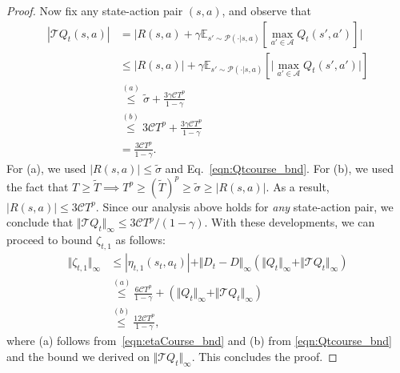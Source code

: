 \documentclass[10pt,a4paper]{amsart}
\newcommand{\mc}{\mathcal}
\begin{document}
\begin{proof}
Now fix any state-action pair $(s,a)$, and observe that
\begin{equation}
\begin{aligned}
|\mc{T}Q_t(s,a)| &= \lvert R(s,a) + \gamma \mathbb{E}_{s' \sim \mc{P}(\cdot| s,a)}[ \max_{a' \in \mc{A}} Q_t(s',a')] \rvert \\
&\leq \lvert R(s,a) \rvert + \gamma \mathbb{E}_{s' \sim \mc{P}(\cdot| s,a)} [ \lvert \max_{a' \in \mc{A}} Q_t(s',a') \rvert] \\
&\overset{(a)}{\le} \tilde{\sigma} + \frac{3 \gamma \mathcal{C} T^p}{1 - \gamma}\\
&\overset{(b)}{\le} 3 \mc{C} T^p + \frac{3 \gamma \mathcal{C} T^p}{1 - \gamma}\\
& = \frac{3 \mathcal{C} T^p}{1 - \gamma}.
\end{aligned}
\end{equation}
For (a), we used $|R(s,a)| \leq \tilde{\sigma}$ and Eq.~\eqref{eqn:Qtcourse_bnd}. For (b), we used the fact that $T \geq \tilde{T}  \implies T^p \geq (\tilde{T})^p \geq \tilde{\sigma} \geq |R(s,a)|$. As a result, $|R(s,a)| \leq 3 \mc{C} T^p.$ Since our analysis above holds for \emph{any} state-action pair, we conclude that $\Vert \mc{T} Q_t \Vert_{\infty} \leq 3 \mc{C} T^p /(1-\gamma).$ With these developments, we can proceed to bound  \(\zeta_{t,1}\) as follows:
\begin{equation*}
\begin{aligned}
\Vert \zeta_{t,1} \Vert_{\infty} &\le \left| \eta_{t,1}(s_t,a_t) \right| + \Vert D_t - D \Vert_{\infty} \left( \Vert Q_t \Vert_{\infty} + \Vert \mc{T} Q_t \Vert_{\infty} \right)
\\
&\overset{(a)}{\le} \frac{6 \mathcal{C} T^p}{1 - \gamma} + \left( \Vert Q_t \Vert_{\infty} + \Vert \mc{T} Q_t \Vert_{\infty} \right) \\
& \overset{(b)}{\le} \frac{12 \mathcal{C} T^p}{1 - \gamma},
\end{aligned}
\end{equation*}
where (a) follows from~\eqref{eqn:etaCourse_bnd} and (b) from \eqref{eqn:Qtcourse_bnd} and the bound we derived on $\Vert \mc{T} Q_t \Vert_{\infty}$. This concludes the proof. 
\end{proof}
\end{document}
